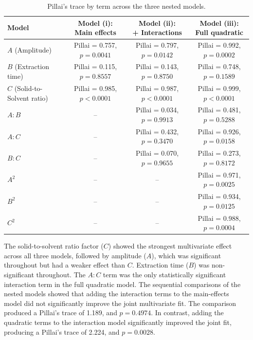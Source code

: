 \documentclass[MScDSA]{uccthesis}
\begin{document}
\begin{table}[H]
\centering
\fontsize{10}{12}\selectfont
\setlength{\tabcolsep}{4pt}
\caption{Pillai's trace by term across the three nested models.}
\label{tab:pillai_nested_models}
\begin{tabular}{lccc}
\toprule
\textbf{Model} &
\makecell{\textbf{Model (i):}\\\textbf{Main effects}} &
\makecell{\textbf{Model (ii):}\\\textbf{+ Interactions}} &
\makecell{\textbf{Model (iii):}\\\textbf{Full quadratic}} \\
\midrule
$A$ (Amplitude)
& Pillai = 0.757, $p = 0.0041$
& Pillai = 0.797, $p = 0.0142$
& Pillai = 0.992, $p = 0.0002$ \\

$B$ (Extraction time)
& Pillai = 0.115, $p = 0.8557$
& Pillai = 0.143, $p = 0.8750$
& Pillai = 0.748, $p = 0.1589$ \\

$C$ (Solid-to-Solvent ratio)
& Pillai = 0.985, $p < 0.0001$
& Pillai = 0.987, $p < 0.0001$
& Pillai = 0.999, $p < 0.0001$ \\
$A:B$ & -- & Pillai = 0.034, $p = 0.9913$ & Pillai = 0.481, $p = 0.5288$ \\
$A:C$ & -- & Pillai = 0.432, $p = 0.3470$ & Pillai = 0.926, $p = 0.0158$ \\
$B:C$ & -- & Pillai = 0.070, $p = 0.9655$ & Pillai = 0.273, $p = 0.8172$ \\
$A^2$ & -- & -- & Pillai = 0.971, $p = 0.0025$ \\
$B^2$ & -- & -- & Pillai = 0.934, $p = 0.0125$ \\
$C^2$ & -- & -- & Pillai = 0.988, $p = 0.0004$ \\
\bottomrule
\end{tabular}
\end{table}

The solid-to-solvent ratio factor ($C$) showed the strongest multivariate effect across all three models, followed by amplitude ($A$), which was significant throughout but had a weaker effect than $C$. Extraction time ($B$) was non-significant throughout. The $A:C$ term was the only statistically significant interaction term in the full quadratic model. 
The sequential comparisons of the nested models showed that adding the interaction terms to the main-effects model did not significantly improve the joint multivariate fit. The comparison produced a Pillai's trace of 1.189, and $p=0.4974$. In contrast, adding the quadratic terms to the interaction model significantly improved the joint fit, producing a Pillai's trace of 2.224, and $p=0.0028$.
\end{document}

